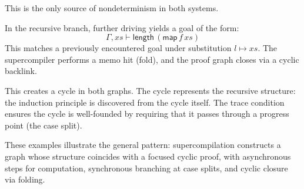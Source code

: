 This is the only source of nondeterminism in both systems.

In the recursive branch, further driving yields a goal of the form:
\[
\Gamma, xs \vdash \mathsf{length}\,(\mathsf{map}\,f\,xs)
\]
This matches a previously encountered goal under substitution $l \mapsto xs$.
The supercompiler performs a memo hit (fold), and the proof graph closes
via a cyclic backlink.

This creates a cycle in both graphs. The cycle represents the recursive
structure: the induction principle is discovered from the cycle itself.
The trace condition ensures the cycle is well-founded by requiring that
it passes through a progress point (the case split).

These examples illustrate the general pattern: supercompilation constructs
a graph whose structure coincides with a focused cyclic proof, with
asynchronous steps for computation, synchronous branching at case splits,
and cyclic closure via folding.
